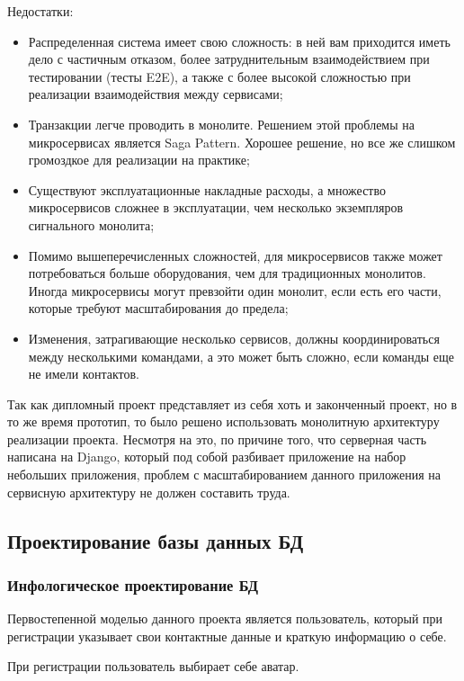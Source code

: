 Недостатки:
\begin{itemize}
    \item Распределенная система имеет свою сложность: в ней вам приходится иметь дело с частичным отказом, более затруднительным взаимодействием при тестировании (тесты E2E), а также с более высокой сложностью при реализации взаимодействия между сервисами;
    \item Транзакции легче проводить в монолите.
    Решением этой проблемы на микросервисах является Saga Pattern.
    Хорошее решение, но все же слишком громоздкое для реализации на практике;
    \item Существуют эксплуатационные накладные расходы, а множество микросервисов сложнее в эксплуатации, чем несколько экземпляров сигнального монолита;
    \item Помимо вышеперечисленных сложностей, для микросервисов также может потребоваться больше оборудования, чем для традиционных монолитов.
    Иногда микросервисы могут превзойти один монолит, если есть его части, которые требуют масштабирования до предела;
    \item Изменения, затрагивающие несколько сервисов, должны координироваться между несколькими командами, а это может быть сложно, если команды еще не имели контактов.


\end{itemize}
\bigbreak

Так как дипломный проект представляет из себя хоть и законченный проект, но в то же время прототип, то было решено использовать монолитную архитектуру реализации проекта.
Несмотря на это, по причине того, что серверная часть написана на Django, который под собой разбивает приложение на набор небольших приложения, проблем с масштабированием данного приложения на сервисную архитектуру не должен составить труда.


\subsection{Проектирование базы данных БД}

\subsubsection{Инфологическое проектирование БД}
Первостепенной моделью данного проекта является пользователь, который при регистрации указывает свои контактные данные и краткую информацию о себе.

При регистрации пользователь выбирает себе аватар.

